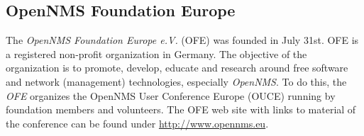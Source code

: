 \subsection*{OpenNMS Foundation Europe}
The \emph{OpenNMS Foundation Europe e.V.} (OFE) was founded in July 31st. OFE is a registered non-profit organization in Germany. The objective of the organization is to promote, develop, educate and research around free software and network (management) technologies, especially \emph{OpenNMS}. To do this, the \emph{OFE} organizes the OpenNMS User Conference Europe (OUCE) running by foundation members and volunteers. The OFE web site with links to material of the conference can be found under \url{http://www.opennms.eu}.